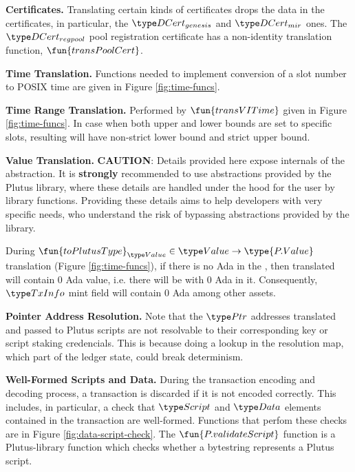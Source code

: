 \textbf{Certificates. }
Translating certain kinds of certificates drops the data in the
certificates, in particular, the $\DCertGen$ and $\DCertMir$ ones.
The $\DCertRegPool$ pool registration certificate has a non-identity translation function,
$\fun{transPoolCert}$.

\textbf{Time Translation.}
Functions needed to implement conversion of a slot number to POSIX time are
given in Figure \ref{fig:time-funcs}.

\textbf{Time Range Translation.}
Performed by $\fun{transVITime}$ given in Figure \ref{fig:time-funcs}.
In case when both upper and lower bounds are set to specific slots,
resulting  will have non-strict lower bound
and strict upper bound.

\textbf{Value Translation.}
\textbf{CAUTION}: Details provided here expose internals of the  abstraction. 
It is \textbf{strongly} recommended to use abstractions provided by the Plutus library, 
where these details are handled under the hood for the user by library functions. 
Providing these details aims to help developers with very specific needs, 
who understand the risk of bypassing abstractions provided by the library.

During $\fun{toPlutusType}_{\Value} \in \Value \to \type{P.Value}$ translation (Figure \ref{fig:time-funcs}),
if there is no Ada in the , then translated  will contain 0 Ada value,
i.e. there will be  with 0 Ada in it. Consequently, $\TxInfo$ mint field 
will contain 0 Ada  among other assets.

\textbf{Pointer Address Resolution. }
Note that the $\Ptr$ addresses translated and passed to Plutus scripts are
not resolvable to their corresponding key or script staking credencials. This
is because doing a lookup in the resolution map, which part of the ledger state,
could break determinism.

\textbf{Well-Formed Scripts and Data. }
During the transaction encoding and decoding process, a transaction is discarded if it is not
encoded correctly. This includes, in particular, a check that $\Script$ and $\Data$
elements contained in the transaction are well-formed. Functions that perfom these checks are
in Figure \ref{fig:data-script-check}. The $\fun{P.validateScript}$ function
is a Plutus-library function which checks whether a bytestring represents a
Plutus script.

